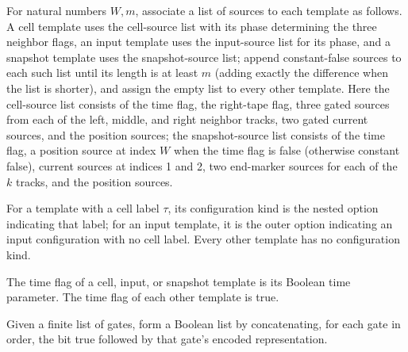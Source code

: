 \begin{definition}
\label{Complexity.UTab.Tpl.srcs}
\leanok
{}
For natural numbers $W,m$, associate a list of sources to each template as follows. A
cell template uses the cell-source list with its phase determining the three neighbor
flags, an input template uses the input-source list for its phase, and a snapshot
template uses the snapshot-source list; append constant-false sources to each such list
until its length is at least $m$ (adding exactly the difference when the list is
shorter), and assign the empty list to every other template. Here the cell-source list
consists of the time flag, the right-tape flag, three gated sources from each of the
left, middle, and right neighbor tracks, two gated current sources, and the position
sources; the snapshot-source list consists of the time flag, a position source at index
$W$ when the time flag is false (otherwise constant false), current sources at indices 1
and 2, two end-marker sources for each of the $k$ tracks, and the position sources.
\end{definition}

\begin{definition}
\label{Complexity.UTab.Tpl.kind}
\leanok
{}
For a template with a cell label $\tau$, its configuration kind is the nested option
indicating that label; for an input template, it is the outer option indicating an input
configuration with no cell label. Every other template has no configuration kind.
\end{definition}

\begin{definition}
\label{Complexity.UTab.Tpl.t0}
\leanok
{}
The time flag of a cell, input, or snapshot template is its Boolean time parameter. The
time flag of each other template is true.
\end{definition}

\begin{definition}
\label{Complexity.UTab.gbits}
\leanok
{}
Given a finite list of gates, form a Boolean list by concatenating, for each gate in
order, the bit true followed by that gate's encoded representation.
\end{definition}


